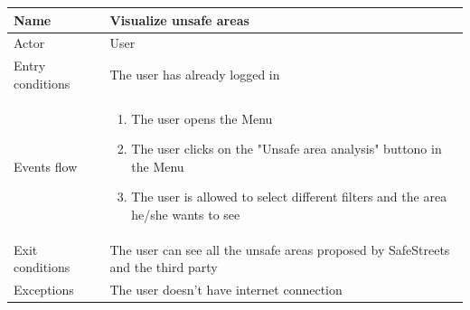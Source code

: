 \documentclass{article}
\begin{document}
\begin{table}[H]
    \begin{tabular}{|l|l|}
    \hline
    Name & \begin{minipage}[t]{0.7\textwidth} Visualize unsafe areas \end{minipage} \\ \hline  
     Actor & \begin{minipage}[t]{0.7\textwidth} User \end{minipage} \\ \hline 
     Entry conditions & \begin{minipage}[t]{0.7\textwidth} The user has already
     logged in\end{minipage} \\
     \hline 
     Events flow & \begin{minipage}[t]{0.7\textwidth} 
    \begin{enumerate}
        \item The user opens the Menu
        \item The user clicks on the "Unsafe area analysis" buttono in the Menu
        \item The user is allowed to select different filters and the area
        he/she wants to see
    \end{enumerate}
    \end{minipage} \\ \hline
     Exit conditions & \begin{minipage}[t]{0.7\textwidth} The user can see all
     the unsafe areas proposed by SafeStreets and the third party\end{minipage}
     \\
     \hline
    Exceptions & \begin{minipage}[t]{0.7\textwidth}  The user doesn't have
    internet connection \end{minipage} \\ \hline
    \end{tabular}
\end{table}
\end{document}
